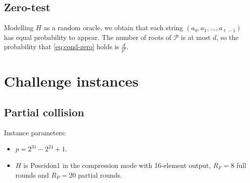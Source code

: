 \documentclass{article}
\begin{document}
\subsection{Zero-test}

Modelling $H$ as a random oracle, we obtain that each string $(a_0,a_1,\ldots,a_{\ell-1})$ has equal probability to appear. The number of roots of $\mathcal{P}$ is at most $d$, so the probability that  \eqref{eq:cond-zero} holds is $\frac{d}{p^r}$.

\section{Challenge instances}

\subsection{Partial collision}

Instance parameters:
\begin{itemize}
    \item $p=2^{31}-2^{24}+1$.
    \item $H$ is Poseidon1 in the compression mode with  16-element output, $R_F=8$ full rounds and $R_P=20$ partial rounds.
\end{itemize}

\end{document}
